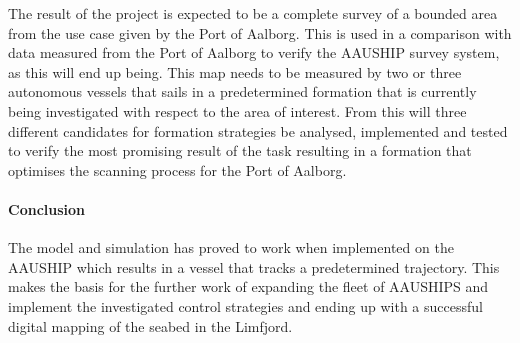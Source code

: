 \documentclass[a4paper,12pt]{article}
\begin{document}

The result of the project is expected to be a complete
survey of a bounded area from the use case given by the Port of
Aalborg. This is used in a comparison with data measured from the Port
of Aalborg to verify the AAUSHIP survey system, as this will end up
being. This map needs to be measured by two or three autonomous
vessels that sails in a predetermined formation that is currently being investigated with respect to the area of interest. From this will three different candidates for formation strategies be analysed, implemented and tested to verify the most promising result of the task resulting in a formation that optimises the scanning process for the Port of Aalborg.

 
\paragraph{Conclusion}
The model and simulation has proved to work when implemented on the AAUSHIP which results in a vessel that tracks a predetermined trajectory. This makes the basis for the further work of expanding the fleet of AAUSHIPS and implement the investigated control strategies and ending up with a successful digital mapping of the seabed in the Limfjord.


\end{document}
